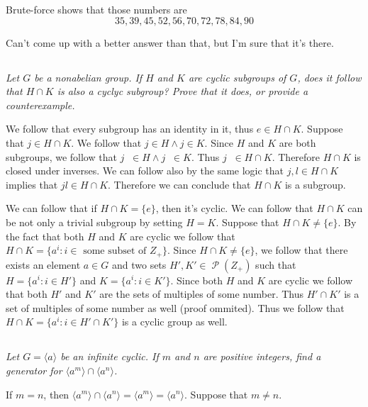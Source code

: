\documentclass[11pt,oneside,titlepage]{book}
\DeclareMathOperator \pow {\mathcal {P}}
\DeclareMathOperator \inv {^{-1}}
\newcommand{\eangle}[1]{\langle #1 \rangle}
\newcommand{\set}[1]{\{ #1 \}}
\begin{document}
Brute-force shows that those numbers are
$$35, 39, 45, 52, 56, 70, 72, 78, 84, 90$$

Can't come up with a better answer than that, but I'm sure that it's there.

\subsection{}

\textit{Let $G$ be a nonabelian group. If $H$ and $K$ are cyclic subgroups of $G$,
  does it follow that $H \cap K$ is also a cyclyc subgroup? Prove that it does,
  or provide a counterexample.}

We follow that every subgroup has an identity in it, thus $e \in H \cap K$.
Suppose that $j \in H \cap K$. We follow that $j \in H \land j \in K$. Since $H$
and $K$ are both subgroups, we follow that $j \inv \in H \land j\inv \in K$. Thus
$j \inv \in H \cap K$. Therefore $H \cap K$ is closed under inverses.
We can follow also by the same logic that $j, l \in H \cap K$ implies that
$jl \in H \cap K$. Therefore we can conclude that $H \cap K$ is a subgroup.

We can follow that if $H \cap K = \set{e}$, then it's cyclic. We can follow that
$H \cap K$ can be not only a trivial subgroup by setting $H = K$. Suppose that
$H \cap K \neq \set{e}$. By the fact that both $H$ and $K$ are cyclic we follow that
$H \cap K = \set{a^i: i \in \text{ some subset of } Z_+}$.
Since $H \cap K \neq \set{e}$, we follow that there exists an element $a \in G$ and
two sets $H', K' \in \pow(Z_+)$ such that $H = \set{a^i: i \in H'}$ and
$K = \set{a^i: i \in K'}$. Since both $H$ and $K$ are cyclic we follow that
both $H'$ and $K'$ are the sets of multiples of some number. Thus
$H' \cap K'$ is a set of multiples of some number as well (proof ommited). Thus we
follow that $H \cap K = \set{a^i: i \in H' \cap K'}$ is a cyclic group as well.

\subsection{}

\textit{Let $G = \eangle{a}$ be an infinite cyclic. If $m$ and $n$ are positive integers,
find a generator for $\eangle{a^m} \cap \eangle{a^n}$.}

If $m = n$, then $\eangle{a^m} \cap \eangle{a^n} = \eangle{a^m} = \eangle{a^n}$.
Suppose that $m \neq n$. 
\end{document}

